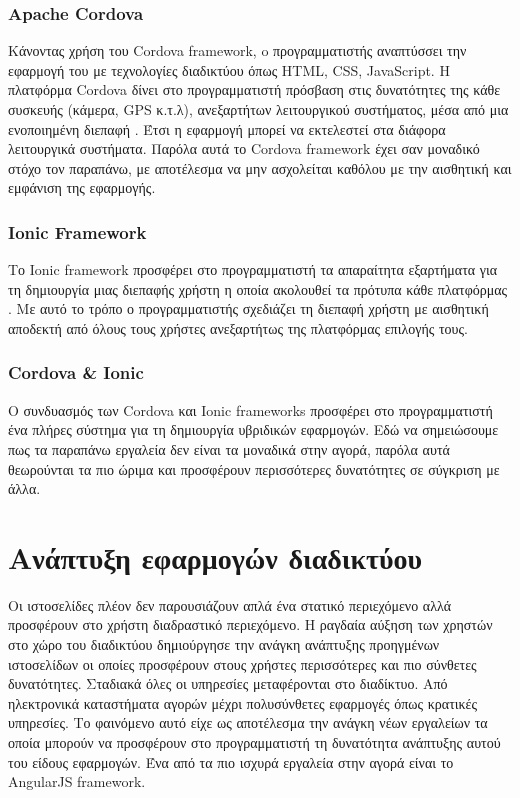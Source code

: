\subsubsection{Apache Cordova}
Κάνοντας χρήση του Cordova framework, o προγραμματιστής αναπτύσσει την εφαρμογή του με τεχνολογίες διαδικτύου όπως HTML, CSS, JavaScript. Η πλατφόρμα Cordova δίνει στο προγραμματιστή πρόσβαση στις δυνατότητες της κάθε συσκευής (κάμερα, GPS κ.τ.λ), ανεξαρτήτων λειτουργικού συστήματος, μέσα από μια ενοποιημένη διεπαφή \citep{Cordova} \citep{CordovaWiki}. Έτσι η εφαρμογή μπορεί να εκτελεστεί στα διάφορα λειτουργικά συστήματα. Παρόλα αυτά το Cordova framework έχει σαν μοναδικό στόχο τον παραπάνω, με αποτέλεσμα να μην ασχολείται καθόλου με την αισθητική και εμφάνιση της εφαρμογής.

\subsubsection{Ionic Framework}
Το Ionic framework προσφέρει στο προγραμματιστή τα απαραίτητα εξαρτήματα για τη δημιουργία μιας διεπαφής χρήστη η οποία ακολουθεί τα πρότυπα κάθε πλατφόρμας \citep{Ionic} \citep{IonicWiki}. Με αυτό το τρόπο ο προγραμματιστής σχεδιάζει τη διεπαφή χρήστη με αισθητική αποδεκτή από όλους τους χρήστες ανεξαρτήτως της πλατφόρμας επιλογής τους.

\subsubsection{Cordova \& Ionic}
Ο συνδυασμός των Cordova και Ionic frameworks προσφέρει στο προγραμματιστή ένα πλήρες σύστημα για τη δημιουργία υβριδικών εφαρμογών. Εδώ να σημειώσουμε πως τα παραπάνω εργαλεία δεν είναι τα μοναδικά στην αγορά, παρόλα αυτά θεωρούνται τα πιο ώριμα και προσφέρουν περισσότερες δυνατότητες σε σύγκριση με άλλα.

\section{Ανάπτυξη εφαρμογών διαδικτύου}
Οι ιστοσελίδες πλέον δεν παρουσιάζουν απλά ένα στατικό περιεχόμενο αλλά προσφέρουν στο χρήστη διαδραστικό περιεχόμενο. Η ραγδαία αύξηση των χρηστών στο χώρο του διαδικτύου δημιούργησε την ανάγκη ανάπτυξης προηγμένων ιστοσελίδων οι οποίες προσφέρουν στους χρήστες περισσότερες και πιο σύνθετες δυνατότητες. Σταδιακά όλες οι υπηρεσίες μεταφέρονται στο διαδίκτυο. Από ηλεκτρονικά καταστήματα αγορών μέχρι πολυσύνθετες εφαρμογές όπως κρατικές υπηρεσίες. Το φαινόμενο αυτό είχε ως αποτέλεσμα την ανάγκη νέων εργαλείων τα οποία μπορούν να προσφέρουν στο προγραμματιστή τη δυνατότητα ανάπτυξης αυτού του είδους εφαρμογών. Ένα από τα πιο ισχυρά εργαλεία στην αγορά είναι το AngularJS framework.

